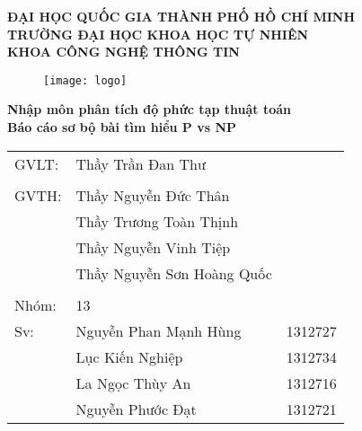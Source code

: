 \begin{titlepage}
\begin{center}
	\large{\textbf{ĐẠI HỌC QUỐC GIA THÀNH PHỐ HỒ CHÍ MINH}}\\
	\large{\textbf{TRƯỜNG ĐẠI HỌC KHOA HỌC TỰ NHIÊN}}\\
	\large{\textbf{KHOA CÔNG NGHỆ THÔNG TIN}}\\
	\vfill
	\begin{figure}[H]
		\centerline{\texttt{[image: logo]}}
	\end{figure}

	\Large{\textbf{Nhập môn phân tích độ phức tạp thuật toán}}\\
	\Large{\textbf{Báo cáo sơ bộ bài tìm hiểu P vs NP}}\\

\end{center}
	\vfill
\begin{flushright}
	
	\begin{tabular}{l l l}
		GVLT: &Thầy Trần Đan Thư\\
		&\\
		GVTH: &Thầy Nguyễn Đức Thân\\
		&Thầy Trương Toàn Thịnh\\
		&Thầy Nguyễn Vinh Tiệp\\
		&Thầy Nguyễn Sơn Hoàng Quốc\\
		&\\
		Nhóm:&13\\
		Sv: &Nguyễn Phan Mạnh Hùng & 1312727\\
		&Lục Kiến Nghiệp & 1312734\\
		&La Ngọc Thùy An & 1312716\\
		&Nguyễn Phước Đạt & 1312721\\
	\end{tabular}
\end{flushright}


\end{titlepage}
